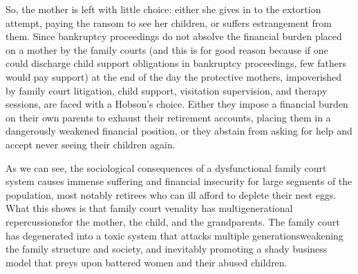 So, the mother is left with little choice: either she gives in to the
extortion attempt, paying the ransom to see her children, 
or suffers estrangement from them. Since bankruptcy proceedings do not absolve
the financial burden placed on a mother by the family courts (and this is
for good reason because if one could discharge child support obligations
in bankruptcy proceedings, few fathers would pay support) at the
end of the day the protective mothers, impoverished by family court 
litigation, child support, visitation supervision, and therapy sessions, are
faced with a Hobson's choice. Either they impose a financial burden on
their own parents to exhaust their retirement accounts, placing them in
a dangerously weakened financial position, or they abstain from asking
for help and accept never seeing their children again. \pfl{}

As we can see, the sociological consequences of a dysfunctional family court system 
causes immense suffering and financial
insecurity for large segments of the population, most notably retirees
who can ill afford to deplete their nest eggs. What this shows is that family court venality has multigenerational repercussions\mdash{}for the mother,
the child, and the grandparents.
The family court has degenerated into a toxic system that
attacks multiple generations\mdash{}weakening the family structure and 
society, and inevitably promoting a shady business model that preys upon
battered women and their abused children. \pfl{}%






